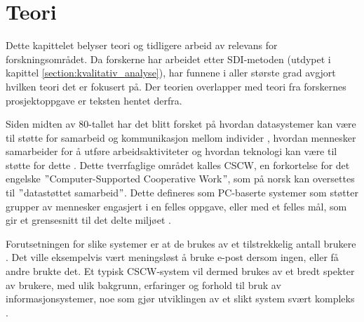 \chapter{Teori}
\label{chp:teori} 
Dette kapittelet belyser teori og tidligere arbeid av relevans for forskningsområdet. Da forskerne har arbeidet etter SDI-metoden (utdypet i kapittel \ref{section:kvalitativ_analyse}), har funnene i aller største grad avgjort hvilken teori det er fokusert på. Der teorien overlapper med teori fra forskernes prosjektoppgave \citep{Sund13} er teksten hentet derfra. 

\noindent
Siden midten av 80-tallet har det blitt forsket på hvordan datasystemer kan være til støtte for samarbeid og kommunikasjon mellom individer \citep{Rogers94}, hvordan mennesker samarbeider for å utføre arbeidsaktiviteter og hvordan teknologi kan være til støtte for dette \citep{Ellis91}. Dette tverrfaglige området kalles CSCW, en forkortelse for det engelske $"$Computer-Supported Cooperative Work$"$, som på norsk kan oversettes til $"$datastøttet samarbeid$"$. Dette defineres som PC-baserte systemer som støtter grupper av mennesker engasjert i en felles oppgave, eller med et felles mål, som gir et grensesnitt til det delte miljøet \citep{Ellis91}.

\noindent
Forutsetningen for slike systemer er at de brukes av et tilstrekkelig antall brukere \citep{Ackermann00}. Det ville eksempelvis vært meningsløst å bruke e-post dersom ingen, eller få andre brukte det. Et typisk CSCW-system vil dermed brukes av et bredt spekter av brukere, med ulik bakgrunn, erfaringer og forhold til bruk av informasjonsystemer, noe som gjør utviklingen av et slikt system svært kompleks \citet{Berg00}.
